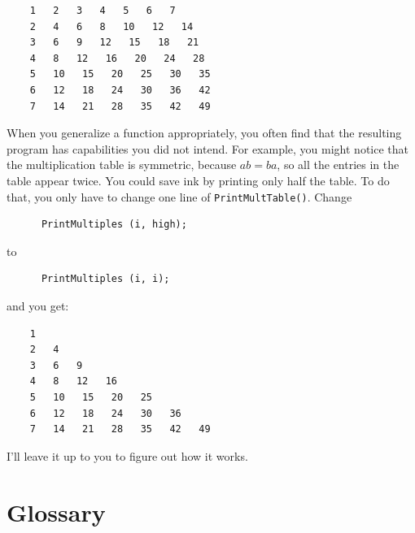 \begin{verbatim}
    1   2   3   4   5   6   7   
    2   4   6   8   10   12   14   
    3   6   9   12   15   18   21   
    4   8   12   16   20   24   28   
    5   10   15   20   25   30   35   
    6   12   18   24   30   36   42   
    7   14   21   28   35   42   49
\end{verbatim}
%
When you generalize a function appropriately, you often find
that the resulting program has capabilities you did not intend.
For example, you might notice that the multiplication table
is symmetric, because $ab = ba$, so all the entries in the
table appear twice.  You could save ink by printing only
half the table.  To do that, you only have to change one
line of {\tt PrintMultTable()}.  Change

\begin{verbatim}
      PrintMultiples (i, high);
\end{verbatim}
%
to

\begin{verbatim}
      PrintMultiples (i, i);
\end{verbatim}
%
and you get:

\begin{verbatim}
    1   
    2   4   
    3   6   9   
    4   8   12   16   
    5   10   15   20   25   
    6   12   18   24   30   36   
    7   14   21   28   35   42   49  
\end{verbatim}
%
I'll leave it up to you to figure out how it works.

\section{Glossary}

